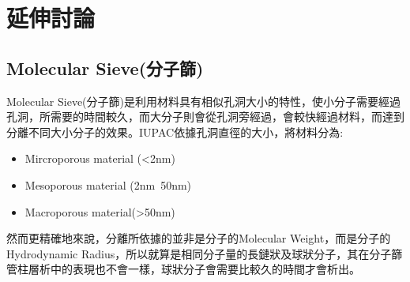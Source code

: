 \newpage
\section*{延伸討論}

\subsection*{Molecular Sieve(分子篩)}
Molecular Sieve(分子篩)是利用材料具有相似孔洞大小的特性，使小分子需要經過孔洞，所需要的時間較久，而大分子則會從孔洞旁經過，會較快經過材料，而達到分離不同大小分子的效果。IUPAC依據孔洞直徑的大小，將材料分為:\cite{Molecula6:online}%

\begin{itemize}
  \item Mircroporous material (<2nm)
  \item Mesoporous material (2nm~50nm)
  \item Macroporous material(>50nm)
\end{itemize}

然而更精確地來說，分離所依據的並非是分子的Molecular Weight，而是分子的Hydrodynamic Radius，所以就算是相同分子量的長鏈狀及球狀分子，其在分子篩管柱層析中的表現也不會一樣，球狀分子會需要比較久的時間才會析出。\cite{YMCSECMA7:online}






 

